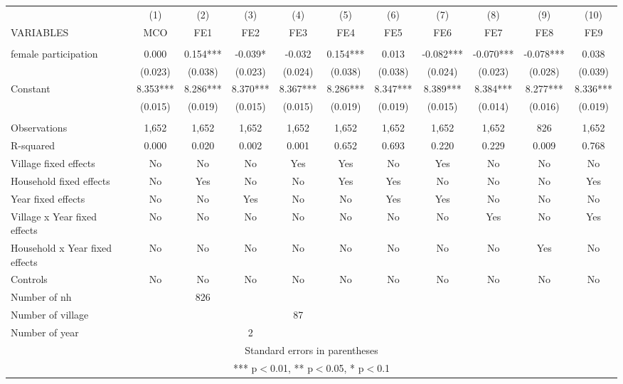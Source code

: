 \documentclass[]{article}
\begin{document}
\begin{tabular}{lcccccccccc} \hline
 & (1) & (2) & (3) & (4) & (5) & (6) & (7) & (8) & (9) & (10) \\
VARIABLES & MCO & FE1 & FE2 & FE3 & FE4 & FE5 & FE6 & FE7 & FE8 & FE9 \\ \hline
 &  &  &  &  &  &  &  &  &  &  \\
female participation & 0.000 & 0.154*** & -0.039* & -0.032 & 0.154*** & 0.013 & -0.082*** & -0.070*** & -0.078*** & 0.038 \\
 & (0.023) & (0.038) & (0.023) & (0.024) & (0.038) & (0.038) & (0.024) & (0.023) & (0.028) & (0.039) \\
Constant & 8.353*** & 8.286*** & 8.370*** & 8.367*** & 8.286*** & 8.347*** & 8.389*** & 8.384*** & 8.277*** & 8.336*** \\
 & (0.015) & (0.019) & (0.015) & (0.015) & (0.019) & (0.019) & (0.015) & (0.014) & (0.016) & (0.019) \\
 &  &  &  &  &  &  &  &  &  &  \\
Observations & 1,652 & 1,652 & 1,652 & 1,652 & 1,652 & 1,652 & 1,652 & 1,652 & 826 & 1,652 \\
R-squared & 0.000 & 0.020 & 0.002 & 0.001 & 0.652 & 0.693 & 0.220 & 0.229 & 0.009 & 0.768 \\
Village fixed effects & No & No & No & Yes & Yes & No & Yes & No & No & No \\
Household fixed effects & No & Yes & No & No & Yes & Yes & No & No & No & Yes \\
Year fixed effects & No & No & Yes & No & No & Yes & Yes & No & No & No \\
Village x Year fixed effects & No & No & No & No & No & No & No & Yes & No & Yes \\
Household x Year fixed effects & No & No & No & No & No & No & No & No & Yes & No \\
Controls & No & No & No & No & No & No & No & No & No & No \\
Number of nh &  & 826 &  &  &  &  &  &  &  &  \\
Number of village &  &  &  & 87 &  &  &  &  &  &  \\
 Number of year &  &  & 2 &  &  &  &  &  &  &  \\ \hline
\multicolumn{11}{c}{ Standard errors in parentheses} \\
\multicolumn{11}{c}{ *** p$<$0.01, ** p$<$0.05, * p$<$0.1} \\
\end{tabular}
\end{document}
